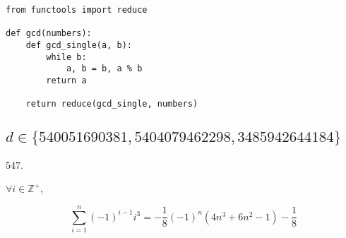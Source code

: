 \documentclass[12pt]{scrartcl}
\begin{document}
\begin{lstlisting}
from functools import reduce

def gcd(numbers):
    def gcd_single(a, b):
        while b:
            a, b = b, a % b
        return a

    return reduce(gcd_single, numbers)
\end{lstlisting}

\subsection{$d \in \{ 540051690381, 5404079462298, 3485942644184 \}$}
$547$.


\problem{}
\begin{theorem}
    $\forall i \in \mathbb{Z}^+$,

    \begin{equation*}\label{eq:1}
        \sum _{i = 1}^n {(-1)}^{i - 1} i^3 = -\frac{1}{8} {(-1)}^n \left( 4n^3 + 6n^2 - 1 \right) - \frac{1}{8}
    \end{equation*}
\end{theorem}
\end{document}
